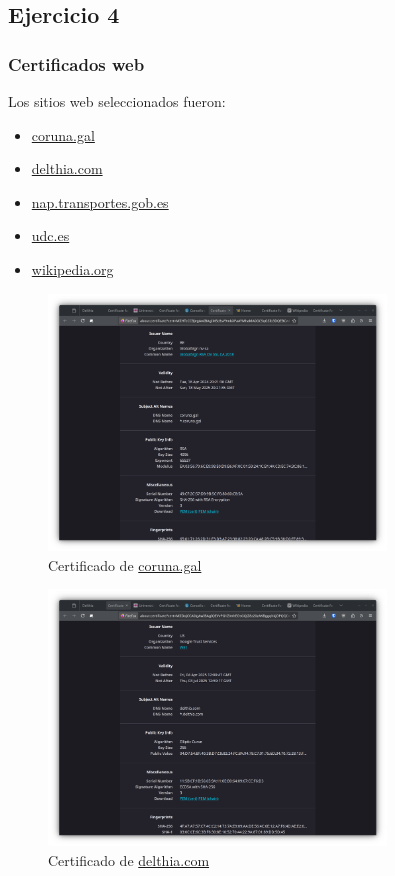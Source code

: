 \subsection{Ejercicio 4}
\graphicspath{ {img/04} }

\subsubsection{Certificados web}

Los sitios web seleccionados fueron:
\begin{itemize}
    \item \href{https://www.coruna.gal}{coruna.gal}
    \item \href{https://delthia.com}{delthia.com}
    \item \href{https://nap.transportes.gob.es}{nap.transportes.gob.es}
    \item \href{https://www.udc.es}{udc.es}
    \item \href{www.wikipedia.org}{wikipedia.org}
\end{itemize}

\begin{figure}[H]   
    \centering
    \includegraphics[width=0.8\textwidth]{cert-coruna.png}
    \caption{Certificado de \url{coruna.gal}}
\end{figure}

\begin{figure}[H]
    \centering
    \includegraphics[width=0.8\textwidth]{cert-delthia.png}
    \caption{Certificado de \url{delthia.com}}
\end{figure}

